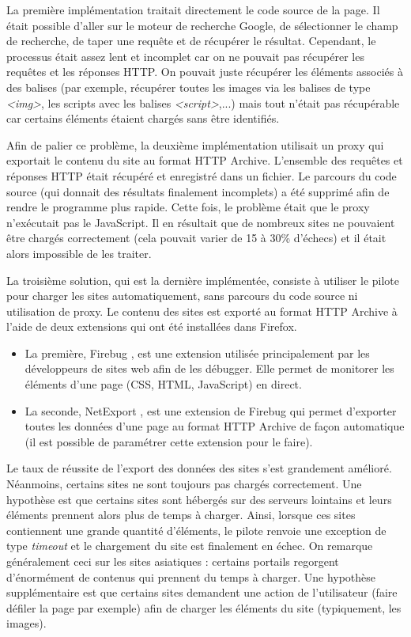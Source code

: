 La première implémentation traitait directement le code source de la page. Il était possible d'aller sur le moteur de recherche Google, de sélectionner le champ de recherche, de taper une requête et de récupérer le résultat. Cependant, le processus était assez lent et incomplet car on ne pouvait pas récupérer les requêtes et les réponses HTTP. On pouvait juste récupérer les éléments associés à des balises (par exemple, récupérer toutes les images via les balises de type \textit{<img>}, les scripts avec les balises \textit{<script>},...) mais tout n'était pas récupérable car certains éléments étaient chargés sans être identifiés.

Afin de palier ce problème, la deuxième implémentation utilisait un proxy qui exportait le contenu du site au format HTTP Archive. L'ensemble des requêtes et réponses HTTP était récupéré et enregistré dans un fichier. Le parcours du code source (qui donnait des résultats finalement incomplets) a été supprimé afin de rendre le programme plus rapide. Cette fois, le problème était que le proxy n'exécutait pas le JavaScript. Il en résultait que de nombreux sites ne pouvaient être chargés correctement (cela pouvait varier de 15 à 30\% d'échecs) et il était alors impossible de les traiter.

La troisième solution, qui est la dernière implémentée, consiste à utiliser le pilote pour charger les sites automatiquement, sans parcours du code source ni utilisation de proxy. Le contenu des sites est exporté au format HTTP Archive à l'aide de deux extensions qui ont été installées dans Firefox.
\begin{itemize}
	\item La première, Firebug \cite{firebug_homepage}, est une extension utilisée principalement par les développeurs de sites web afin de les débugger. Elle permet de monitorer les éléments d'une page (CSS, HTML, JavaScript) en direct.
	\item La seconde, NetExport \cite{netexport_homepage}, est une extension de Firebug qui permet d'exporter toutes les données d'une page au format HTTP Archive de façon automatique (il est possible de paramétrer cette extension pour le faire).
\end{itemize}

Le taux de réussite de l'export des données des sites s'est grandement amélioré. Néanmoins, certains sites ne sont toujours pas chargés correctement.
Une hypothèse est que certains sites sont hébergés sur des serveurs lointains et leurs éléments prennent alors plus de temps à charger. Ainsi, lorsque ces sites contiennent une grande quantité d'éléments, le pilote renvoie une exception de type \textit{timeout} et le chargement du site est finalement en échec. On remarque généralement ceci sur les sites asiatiques : certains portails regorgent d'énormément de contenus qui prennent du temps à charger.
Une hypothèse supplémentaire est que certains sites demandent une action de l'utilisateur (faire défiler la page par exemple) afin de charger les éléments du site (typiquement, les images).
\newline

